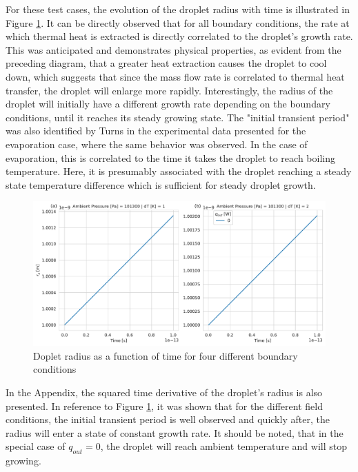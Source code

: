 \documentclass[12pt]{article}
\begin{document}
For these test cases, the evolution of the droplet radius with time is illustrated in Figure \ref{f:r_s}. It can be directly observed that for all boundary conditions, the rate at which thermal heat is extracted is directly correlated to the droplet's growth rate. This was anticipated and demonstrates physical properties, as evident from the preceding diagram, that a greater heat extraction causes the droplet to cool down, which suggests that since the mass flow rate is correlated to thermal heat transfer, the droplet will enlarge more rapidly. Interestingly, the radius of the droplet will initially have a different growth rate depending on the boundary conditions, until it reaches its steady growing state. The "initial transient period" was also identified by Turns \cite{turns2011introduction} in the experimental data presented for the evaporation case, where the same behavior was observed. In the case of evaporation, this is correlated to the time it takes the droplet to reach boiling temperature. Here, it is presumably associated with the droplet reaching a steady state temperature difference which is sufficient for steady droplet growth. 

\begin{figure}[H]
    \centering
    \includegraphics[width=1\textwidth]{Figures/r_s.pdf}
    \caption{Doplet radius as a function of time for four different boundary conditions}
    \label{f:r_s}
\end{figure}
In the Appendix, the squared time derivative of the droplet's radius is also presented. In reference to Figure \ref{f:r_s}, it was shown that for the different field conditions, the initial transient period is well observed and quickly after, the radius will enter a state of constant growth rate. It should be noted, that in the special case of $q_{out}=0$, the droplet will reach ambient temperature and will stop growing.
\newpage
\end{document}
